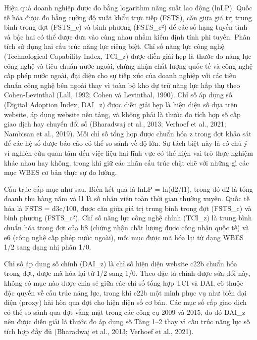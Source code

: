 \documentclass[12pt,a4paper]{article}
\begin{document}
Hiệu quả doanh nghiệp được đo bằng logarithm năng suất lao động (lnLP).
Quốc tế hóa được đo bằng cường độ xuất khẩu trực tiếp (FSTS), căn giữa
giá trị trung bình trong đợt (FSTS\_c) và bình phương (FSTS\_c²) để các
số hạng tuyến tính và bậc hai có thể được đưa vào cùng nhau nhằm kiểm
định tính phi tuyến. Phân tích sử dụng hai cấu trúc năng lực riêng biệt.
Chỉ số năng lực công nghệ (Technological Capability Index, TCI\_z) được
diễn giải hẹp là thước đo năng lực công nghệ và tiêu chuẩn nước ngoài,
chứng nhận chất lượng quốc tế và công nghệ cấp phép nước ngoài, đại diện
cho sự tiếp xúc của doanh nghiệp với các tiêu chuẩn công nghệ bên ngoài
thay vì toàn bộ kho dự trữ năng lực hấp thụ theo Cohen-Levinthal (Lall,
1992; Cohen và Levinthal, 1990). Chỉ số áp dụng số (Digital Adoption
Index, DAI\_z) được diễn giải hẹp là hiện diện số dựa trên website, áp
dụng website nền tảng, và không phải là thước đo tích hợp số cấp giao
dịch hay chuyển đổi số (Bharadwaj et al., 2013; Verhoef et al., 2021;
Nambisan et al., 2019). Mỗi chỉ số tổng hợp được chuẩn hóa z trong đợt
khảo sát để các hệ số được báo cáo có thể so sánh về độ lớn. Sự tách
biệt này là có chủ ý vì nghiên cứu quan tâm đến việc liệu hai lĩnh vực
có thể hiện vai trò thực nghiệm khác nhau hay không, trong khi giữ các
nhãn cấu trúc chặt chẽ với những gì các mục WBES cơ bản thực sự đo
lường.

Cấu trúc cấp mục như sau. Biến kết quả là lnLP = ln(d2/l1), trong đó d2
là tổng doanh thu hàng năm và l1 là số nhân viên toàn thời gian thường
xuyên. Quốc tế hóa là FSTS = d3c/100, được căn giữa giá trị trung bình
trong đợt (FSTS\_c) và bình phương (FSTS\_c²). Chỉ số năng lực công nghệ
chính (TCI\_z) là trung bình chuẩn hóa trong đợt của b8 (chứng nhận chất
lượng được công nhận quốc tế) và e6 (công nghệ cấp phép nước ngoài), mỗi
mục được mã hóa lại từ dạng WBES 1/2 sang dạng nhị phân 1/0.

Chỉ số áp dụng số chính (DAI\_z) là chỉ số hiện diện website c22b chuẩn
hóa trong đợt, được mã hóa lại từ 1/2 sang 1/0. Theo đặc tả chính được
sửa đổi này, không có mục nào được chia sẻ giữa các chỉ số tổng hợp TCI
và DAI, e6 thuộc độc quyền về cấu trúc năng lực, trong khi c22b một mình
phục vụ như biến đại diện (proxy) hài hòa qua đợt cho hiện diện số cơ
bản. Các mục số cấp giao dịch có thể so sánh qua đợt vắng mặt trong các
công cụ 2009 và 2015, do đó DAI\_z nên được diễn giải là thước đo áp
dụng số Tầng 1--2 thay vì cấu trúc năng lực số tích hợp đầy đủ
(Bharadwaj et al., 2013; Verhoef et al., 2021).
\end{document}
